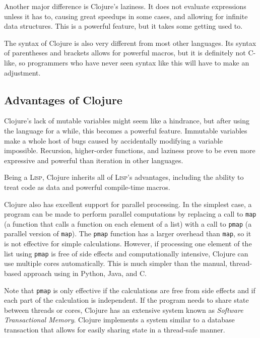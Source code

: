 \documentclass{article}
\begin{document}
Another major difference is Clojure's laziness.  It does not evaluate
expressions unless it has to, causing great speedups in some cases, and allowing
for infinite data structures.  This is a powerful feature, but it takes some
getting used to.  

The syntax of Clojure is also very different from most other languages.  Its
syntax of parentheses and brackets allows for powerful macros, but it is
definitely not C-like, so programmers who have never seen syntax like this will
have to make an adjustment.

\subsection{Advantages of Clojure}

Clojure's lack of mutable variables might seem like a hindrance, but after
using the language for a while, this becomes a powerful feature.  Immutable
variables make a whole host of bugs caused by accidentally modifying a variable
impossible.  Recursion, higher-order functions, and laziness prove to be even
more expressive and powerful than iteration in other languages.

Being a \textsc{Lisp}, Clojure inherits all of \textsc{Lisp}'s advantages,
including the ability to treat code as data and powerful compile-time macros.

Clojure also has excellent support for parallel processing.  In the simplest
case, a program can be made to perform parallel computations by replacing a call
to \texttt{map} (a function that calls a function on each element of a list)
with a call to \texttt{pmap} (a parallel version of \texttt{map}).  The
\texttt{pmap} function has a larger overhead than \texttt{map}, so it is not
effective for simple calculations.  However, if processing one element of the
list using \texttt{pmap} is free of side effects and computationally intensive,
Clojure can use multiple cores automatically.  This is much simpler than the
manual, thread-based approach using in Python, Java, and C.

Note that \texttt{pmap} is only effective if the calculations are free from side
effects and if each part of the calculation is independent.  If the program
needs to share state between threads or cores, Clojure has an extensive system
known as \emph{Software Transactional Memory}.  Clojure implements a system similar to
a database transaction that allows for easily sharing state in a thread-safe
manner.  
\end{document}
